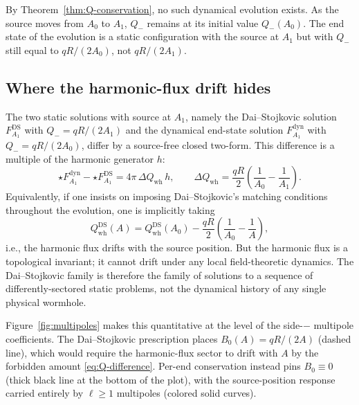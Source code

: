 \documentclass[aps,prd,onecolumn,nofootinbib,superscriptaddress]{revtex4-2}
\begin{document}
By Theorem~\ref{thm:Q-conservation}, no such dynamical evolution exists. As the source moves from $A_0$ to $A_1$, $Q_-$ remains at its initial value $Q_-(A_0)$. The end state of the evolution is a static configuration with the source at $A_1$ but with $Q_-$ still equal to $qR/(2A_0)$, not $qR/(2A_1)$.

\subsection{Where the harmonic-flux drift hides}

The two static solutions with source at $A_1$, namely the Dai--Stojkovic solution $F_{A_1}^{\mathrm{DS}}$ with $Q_- = qR/(2A_1)$ and the dynamical end-state solution $F_{A_1}^{\mathrm{dyn}}$ with $Q_- = qR/(2A_0)$, differ by a source-free closed two-form. This difference is a multiple of the harmonic generator $h$:
\begin{equation}
\star F_{A_1}^{\mathrm{dyn}} - \star F_{A_1}^{\mathrm{DS}} = 4\pi\,\Delta Q_{\mathrm{wh}}\, h, \qquad
\Delta Q_{\mathrm{wh}} = \frac{qR}{2}\!\left(\frac{1}{A_0}-\frac{1}{A_1}\right).
\end{equation}
Equivalently, if one insists on imposing Dai--Stojkovic's matching conditions throughout the evolution, one is implicitly taking
\begin{equation}
Q_{\mathrm{wh}}^{\mathrm{DS}}(A) = Q_{\mathrm{wh}}^{\mathrm{DS}}(A_0) - \frac{qR}{2}\!\left(\frac{1}{A_0}-\frac{1}{A}\right),
\end{equation}
i.e., the harmonic flux drifts with the source position. But the harmonic flux is a topological invariant; it cannot drift under any local field-theoretic dynamics. The Dai--Stojkovic family is therefore the family of solutions to a sequence of differently-sectored static problems, not the dynamical history of any single physical wormhole.

Figure~\ref{fig:multipoles} makes this quantitative at the level of the side-$-$ multipole coefficients. The Dai--Stojkovic prescription places $B_0(A) = qR/(2A)$ (dashed line), which would require the harmonic-flux sector to drift with $A$ by the forbidden amount \eqref{eq:Q-difference}. Per-end conservation instead pins $B_0 \equiv 0$ (thick black line at the bottom of the plot), with the source-position response carried entirely by $\ell \ge 1$ multipoles (colored solid curves).
\end{document}
